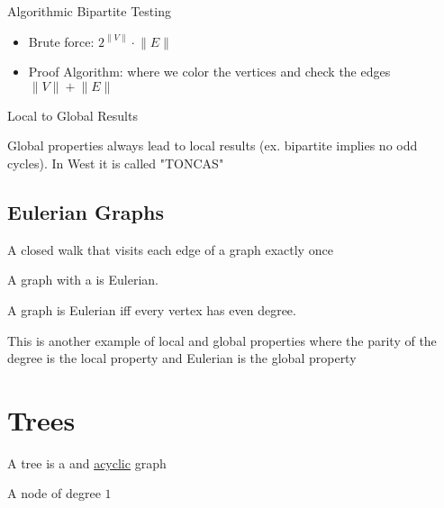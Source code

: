 
\begin{remark}
	Algorithmic Bipartite Testing
	\begin{itemize}
		\item Brute force: \(2^{\lVert V \rVert} \cdot \lVert E \rVert \) 
		\item Proof Algorithm: where we color the vertices and check the edges \(\lVert V \rVert + \lVert E \rVert \) 
	\end{itemize}
\end{remark}

\begin{remark}
	Local to Global Results

	Global properties always lead to local results (ex. bipartite implies no odd cycles). In West it is called "TONCAS"
\end{remark}

\subsection{Eulerian Graphs}

\begin{definition}
	\label{def:euler tour}
	A closed walk that visits each edge of a graph exactly once
\end{definition}

\begin{definition}
	\label{def:eulerian graph}
	A graph with a  is Eulerian.
\end{definition}

\begin{proposition}
	A graph is Eulerian iff every vertex has even degree.
\end{proposition}

\begin{note}
	This is another example of local and global properties where the parity of the degree is the local property and Eulerian is the global property
\end{note} 

\section{Trees}
\begin{definition}[tree]
	\label{def:tree}
	A tree is a  and \hyperref[def:cycle]{acyclic} graph
	\begin{definition}[leaf]
		\label{def:leaf}
		A node of degree \(1\) 
	\end{definition}
\end{definition}

